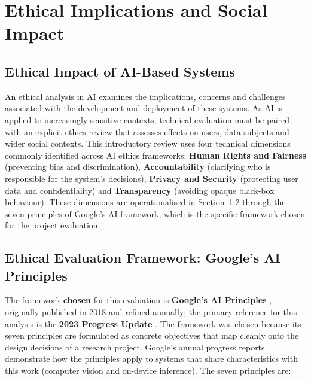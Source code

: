 \chapter{Ethical Implications and Social Impact}
\setcounter{section}{0}

\section{Ethical Impact of AI-Based Systems}
An ethical analysis in AI examines the implications, concerns and challenges associated with the
development and deployment of these systems. As AI is applied to increasingly sensitive contexts,
technical evaluation must be paired with an explicit ethics review that assesses effects on users,
data subjects and wider social contexts. This introductory review uses four technical dimensions
commonly identified across AI ethics frameworks: \textbf{Human Rights and Fairness} (preventing
bias and discrimination), \textbf{Accountability} (clarifying who is responsible for the system's
decisions), \textbf{Privacy and Security} (protecting user data and confidentiality) and
\textbf{Transparency} (avoiding opaque black-box behaviour). These dimensions are operationalised
in Section~\ref{sec:google_ai_principles} through the seven principles of Google's AI framework,
which is the specific framework chosen for the project evaluation.

\section{Ethical Evaluation Framework: Google's AI Principles}
\label{sec:google_ai_principles}

The framework \textbf{chosen} for this evaluation is \textbf{Google's AI Principles}
\cite{googleaiprinciples2018}, originally published in 2018 and refined annually; the primary
reference for this analysis is the \textbf{2023 Progress Update} \cite{googleaiprinciples2023}. The
framework was chosen because its seven principles are formulated as concrete objectives that map
cleanly onto the design decisions of a research project. Google's annual progress reports
demonstrate how the principles apply to systems that share characteristics with this work (computer
vision and on-device inference). The seven principles are:

